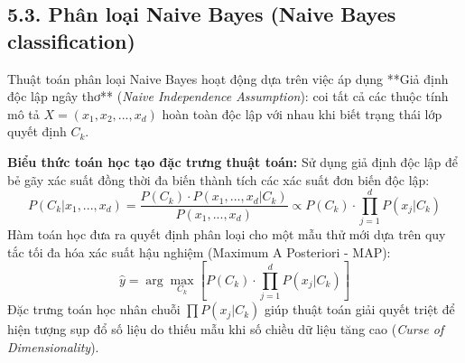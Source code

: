 \documentclass[../main.tex]{subfiles}
\begin{document}
\subsection{5.3. Phân loại Naive Bayes (Naive Bayes classification)}
Thuật toán phân loại Naive Bayes hoạt động dựa trên việc áp dụng **Giả định độc lập ngây thơ** (\textit{Naive Independence Assumption}): coi tất cả các thuộc tính mô tả $X = (x_1, x_2, ..., x_d)$ hoàn toàn độc lập với nhau khi biết trạng thái lớp quyết định $C_k$.

\textbf{Biểu thức toán học tạo đặc trưng thuật toán:} Sử dụng giả định độc lập để bẻ gãy xác suất đồng thời đa biến thành tích các xác suất đơn biến độc lập:
\begin{equation}
    P(C_k | x_1, ..., x_d) = \frac{P(C_k) \cdot P(x_1, ..., x_d | C_k)}{P(x_1, ..., x_d)} \propto P(C_k) \cdot \prod_{j=1}^{d} P(x_j | C_k)
\end{equation}
Hàm toán học đưa ra quyết định phân loại cho một mẫu thử mới dựa trên quy tắc tối đa hóa xác suất hậu nghiệm (Maximum A Posteriori - MAP):
\begin{equation}
    \hat{y} = \arg\max_{C_k} \left[ P(C_k) \cdot \prod_{j=1}^{d} P(x_j | C_k) \right]
\end{equation}
Đặc trưng toán học nhân chuỗi $\prod P(x_j | C_k)$ giúp thuật toán giải quyết triệt để hiện tượng sụp đổ số liệu do thiếu mẫu khi số chiều dữ liệu tăng cao (\textit{Curse of Dimensionality}).
\end{document}

